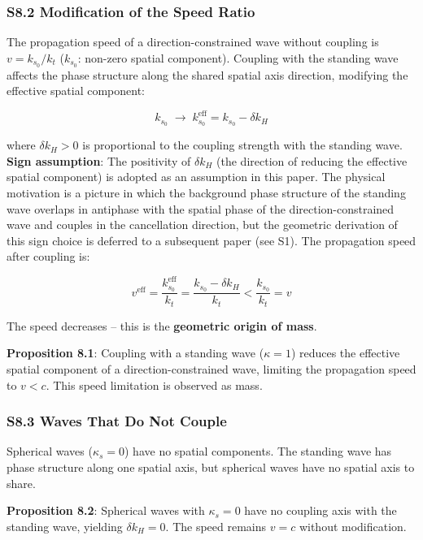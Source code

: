 \documentclass[
  a4paper,11pt]{article}
\theoremstyle{definition}
\theoremstyle{remark}
\begin{document}
\subsubsection{S8.2 Modification of the Speed
Ratio}\label{s8.2-modification-of-the-speed-ratio}

The propagation speed of a direction-constrained wave without coupling
is \(v = k_{s_0} / k_t\) (\(k_{s_0}\): non-zero spatial component).
Coupling with the standing wave affects the phase structure along the
shared spatial axis direction, modifying the effective spatial
component:

\[k_{s_0} \;\longrightarrow\; k_{s_0}^{\text{eff}} = k_{s_0} - \delta k_H\]

where \(\delta k_H > 0\) is proportional to the coupling strength with
the standing wave. \textbf{Sign assumption}: The positivity of
\(\delta k_H\) (the direction of reducing the effective spatial
component) is adopted as an assumption in this paper. The physical
motivation is a picture in which the background phase structure of the
standing wave overlaps in antiphase with the spatial phase of the
direction-constrained wave and couples in the cancellation direction,
but the geometric derivation of this sign choice is deferred to a
subsequent paper (see S1). The propagation speed after coupling is:

\[v^{\text{eff}} = \frac{k_{s_0}^{\text{eff}}}{k_t} = \frac{k_{s_0} - \delta k_H}{k_t} < \frac{k_{s_0}}{k_t} = v\]

The speed decreases -- this is the \textbf{geometric origin of mass}.

\textbf{Proposition 8.1}: Coupling with a standing wave (\(\kappa = 1\))
reduces the effective spatial component of a direction-constrained wave,
limiting the propagation speed to \(v < c\). This speed limitation is
observed as mass.

\subsubsection{S8.3 Waves That Do Not
Couple}\label{s8.3-waves-that-do-not-couple}

Spherical waves (\(\kappa_s = 0\)) have no spatial components. The
standing wave has phase structure along one spatial axis, but spherical
waves have no spatial axis to share.

\textbf{Proposition 8.2}: Spherical waves with \(\kappa_s = 0\) have no
coupling axis with the standing wave, yielding \(\delta k_H = 0\). The
speed remains \(v = c\) without modification.
\end{document}
